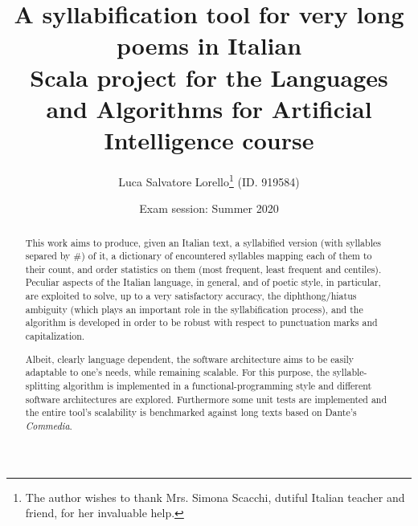 \documentclass[a4paper,singleside,11pt]{report}
\begin{document}
	\title{A syllabification tool for very long poems in Italian\\
	\large Scala project for the Languages and Algorithms for Artificial Intelligence course}
	\author{Luca Salvatore Lorello\thanks{The author wishes to thank Mrs. Simona Scacchi, dutiful Italian teacher and friend, for her invaluable help.} (ID. 919584)}
	\date{Exam session: Summer 2020}
	\maketitle
	\tableofcontents
	
	\begin{abstract}
		This work aims to produce, given an Italian text, a syllabified version (with syllables separed by $\#$) of it, a dictionary of encountered syllables mapping each of them to their count, and order statistics on them (most frequent, least frequent and centiles).
		Peculiar aspects of the Italian language, in general, and of poetic style, in particular, are exploited to solve, up to a very satisfactory accuracy, the diphthong/hiatus ambiguity (which plays an important role in the syllabification process), and the algorithm is developed in order to be robust with respect to punctuation marks and capitalization.
		
		Albeit, clearly language dependent, the software architecture aims to be easily adaptable to one's needs, while remaining scalable. For this purpose, the syllable-splitting algorithm is implemented in a functional-programming style and different software architectures are explored.
		Furthermore some unit tests are implemented and the entire tool's scalability is benchmarked against long texts based on Dante's \emph{Commedia}.
	\end{abstract}
	
	
	
	

	
	\appendix
	
	\lstlistoflistings
	
	\printbibliography %
\end{document}
